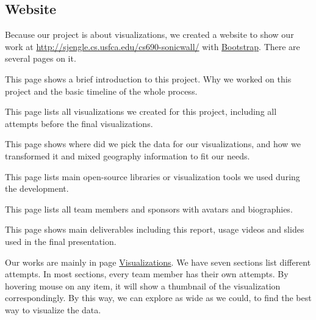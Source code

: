 \documentclass[paper=a4, fontsize=11pt]{report} %
\begin{document}
\subsection{Website} %
\label{sub:website}

Because our project is about visualizations, we created a website to show our work at \url{http://sjengle.cs.usfca.edu/cs690-sonicwall/} with \href{http://getbootstrap.com/}{Bootstrap}.
There are several pages on it.

\begin{description}[style=nextline]
    \item[\href{http://sjengle.cs.usfca.edu/cs690-sonicwall/}{Home}]
    This page shows a brief introduction to this project. Why we worked on this project and the basic timeline of the whole process.
    \item[\href{http://sjengle.cs.usfca.edu/cs690-sonicwall/visual.html}{Visualizations}]
    This page lists all visualizations we created for this project, including all attempts before the final visualizations.
    \item[\href{http://sjengle.cs.usfca.edu/cs690-sonicwall/data.html}{Data}]
    This page shows where did we pick the data for our visualizations, and how we transformed it and mixed geography information to fit our needs.
    \item[\href{http://sjengle.cs.usfca.edu/cs690-sonicwall/tools.html}{Tools}]
    This page lists main open-source libraries or visualization tools we used during the development.
    \item[\href{http://sjengle.cs.usfca.edu/cs690-sonicwall/team.html}{Team}]
    This page lists all team members and sponsors with avatars and biographies.
    \item[\href{http://sjengle.cs.usfca.edu/cs690-sonicwall/deliverables.html}{Deliverables}]
    This page shows main deliverables including this report, usage videos and slides used in the final presentation.
\end{description}

Our works are mainly in page \href{http://sjengle.cs.usfca.edu/cs690-sonicwall/visual.html}{Visualizations}.
We have seven sections list different attempts.
In most sections, every team member has their own attempts.
By hovering mouse on any item, it will show a thumbnail of the visualization correspondingly.
By this way, we can explore as wide as we could, to find the best way to visualize the data.

\end{document}
